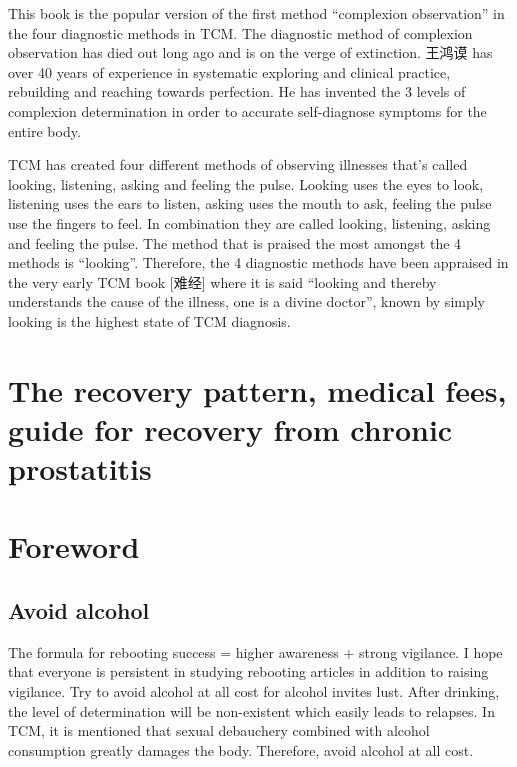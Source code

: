 \documentclass[
]{book}
\begin{document}
This book is the popular version of the first method ``complexion observation'' in the four diagnostic methods in TCM. The diagnostic method of complexion observation has died out long ago and is on the verge of extinction. 王鸿谟 has over 40 years of experience in systematic exploring and clinical practice, rebuilding and reaching towards perfection. He has invented the 3 levels of complexion determination in order to accurate self-diagnose symptoms for the entire body.

TCM has created four different methods of observing illnesses that's called looking, listening, asking and feeling the pulse. Looking uses the eyes to look, listening uses the ears to listen, asking uses the mouth to ask, feeling the pulse use the fingers to feel. In combination they are called looking, listening, asking and feeling the pulse. The method that is praised the most amongst the 4 methods is ``looking''. Therefore, the 4 diagnostic methods have been appraised in the very early TCM book {[}难经{]} where it is said ``looking and thereby understands the cause of the illness, one is a divine doctor'', known by simply looking is the highest state of TCM diagnosis.

\hypertarget{the-recovery-pattern-medical-fees-guide-for-recovery-from-chronic-prostatitis}{%
\chapter{The recovery pattern, medical fees, guide for recovery from chronic prostatitis}\label{the-recovery-pattern-medical-fees-guide-for-recovery-from-chronic-prostatitis}}

\hypertarget{foreword-12}{%
\chapter{Foreword}\label{foreword-12}}

\hypertarget{avoid-alcohol}{%
\section{Avoid alcohol}\label{avoid-alcohol}}

The formula for rebooting success = higher awareness + strong vigilance. I hope that everyone is persistent in studying rebooting articles in addition to raising vigilance. Try to avoid alcohol at all cost for alcohol invites lust. After drinking, the level of determination will be non-existent which easily leads to relapses. In TCM, it is mentioned that sexual debauchery combined with alcohol consumption greatly damages the body. Therefore, avoid alcohol at all cost.
\end{document}
